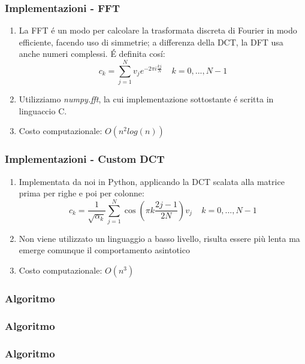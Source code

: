 \documentclass{beamer}
\begin{document}
\begin{frame}
\frametitle{Implementazioni - FFT}
\begin{enumerate}
\item La FFT \'e un modo per calcolare la trasformata discreta di Fourier in modo efficiente, facendo uso di simmetrie; a differenza della DCT, la DFT usa anche numeri complessi. \'E definita cos\'i:
\[c_k = \sum\limits_{j = 1}^N v_j e^{-2 \pi i \frac{kj}{N}} \;\;\;\; k = 0,...,N-1\]
\item Utilizziamo \textit{numpy.fft}, la cui implementazione sottostante \'e scritta in linguaccio C.
\item Costo computazionale: $O(n^2log(n))$
\end{enumerate}
\end{frame}
\begin{frame}
\frametitle{Implementazioni - Custom DCT}
\begin{enumerate}
\item Implementata da noi in Python, applicando la DCT scalata alla matrice prima per righe e poi per colonne:
\[c_k = \frac{1}{\sqrt{\alpha_k}} \sum\limits_{j=1}^N \cos(\pi k \frac{2j - 1}{2N}) v_j \;\;\;\; k = 0,...,N-1\]
\item Non viene utilizzato un linguaggio a basso livello, risulta essere più lenta ma emerge comunque il comportamento asintotico
\item Costo computazionale: $O(n^3)$
\end{enumerate}
\end{frame}

\begin{frame}
\frametitle{Algoritmo}
	
\end{frame}

\begin{frame}
\frametitle{Algoritmo}
	
\end{frame}

\begin{frame}
\frametitle{Algoritmo}
	
\end{frame}
\end{document}
